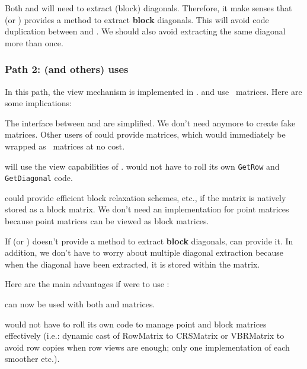 \item Both \Tifpack and \muelu will need to extract (block) diagonals. Therefore, it make senses that \Tpetra (or \TpetraExt) provides a
method to extract \textbf{block} diagonals. This will avoid code duplication between \mulu and \Tifpack. We should also avoid extracting the
same diagonal more than once.

\ee

\subsubsection{Path 2: \Tifpack (and others) uses \cthulhu}

In this path, the view mechanism is implemented in \cthulhu. \Tifpack and \mulu use \cthulhu\ matrices.
Here are some implications:
\be
  \item The interface between \mulu and \Tifpack are simplified. We don't need anymore to create fake \Tpetra matrices. Other users of \Tifpack could provide \Tpetra matrices, which would immediately be wrapped as \cthulhu\ matrices at no cost.

  \item \Tifpack will use the view capabilities of \cthulhu. \Tifpack would not have to roll its own {\tt GetRow} and {\tt GetDiagonal} code.
  \item \Tifpack could provide efficient block relaxation schemes, etc., if the matrix is natively stored as a block matrix. We don't need an implementation for point matrices because point matrices can be viewed as block matrices.

  \item If \Tpetra (or \TpetraExt) doesn't provide a method to extract \textbf{block} diagonals, \cthulhu can provide it. In addition, we don't have to worry about multiple diagonal extraction because when the diagonal have been extracted, it is stored within the \cthulhu matrix.
\ee

\noindent Here are the main advantages if \Tifpack were to use \cthulhu:
\be
\item \Tifpack can now be used with  both \Epetra and \Tpetra matrices.
\item \Tifpack would not have to roll its own code to manage point and block matrices effectively (i.e.: dynamic cast of RowMatrix to CRSMatrix or VBRMatrix to avoid row copies when row views are enough; only one implementation of each smoother etc.). 

